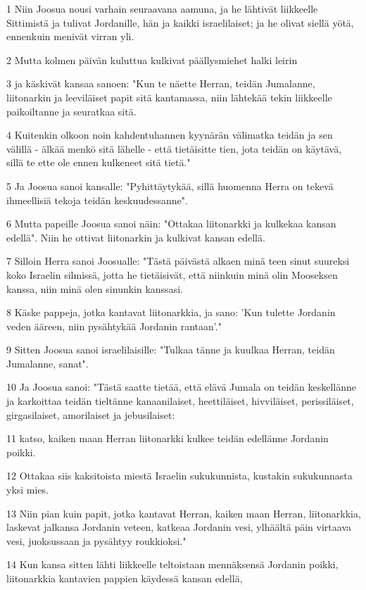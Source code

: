 \par 1 Niin Joosua nousi varhain seuraavana aamuna, ja he lähtivät liikkeelle Sittimistä ja tulivat Jordanille, hän ja kaikki israelilaiset; ja he olivat siellä yötä, ennenkuin menivät virran yli.
\par 2 Mutta kolmen päivän kuluttua kulkivat päällysmiehet halki leirin
\par 3 ja käskivät kansaa sanoen: "Kun te näette Herran, teidän Jumalanne, liitonarkin ja leeviläiset papit sitä kantamassa, niin lähtekää tekin liikkeelle paikoiltanne ja seuratkaa sitä.
\par 4 Kuitenkin olkoon noin kahdentuhannen kyynärän välimatka teidän ja sen välillä - älkää menkö sitä lähelle - että tietäisitte tien, jota teidän on käytävä, sillä te ette ole ennen kulkeneet sitä tietä."
\par 5 Ja Joosua sanoi kansalle: "Pyhittäytykää, sillä huomenna Herra on tekevä ihmeellisiä tekoja teidän keskuudessanne".
\par 6 Mutta papeille Joosua sanoi näin: "Ottakaa liitonarkki ja kulkekaa kansan edellä". Niin he ottivat liitonarkin ja kulkivat kansan edellä.
\par 7 Silloin Herra sanoi Joosualle: "Tästä päivästä alkaen minä teen sinut suureksi koko Israelin silmissä, jotta he tietäisivät, että niinkuin minä olin Mooseksen kanssa, niin minä olen sinunkin kanssasi.
\par 8 Käske pappeja, jotka kantavat liitonarkkia, ja sano: 'Kun tulette Jordanin veden ääreen, niin pysähtykää Jordanin rantaan'."
\par 9 Sitten Joosua sanoi israelilaisille: "Tulkaa tänne ja kuulkaa Herran, teidän Jumalanne, sanat".
\par 10 Ja Joosua sanoi: "Tästä saatte tietää, että elävä Jumala on teidän keskellänne ja karkoittaa teidän tieltänne kanaanilaiset, heettiläiset, hivviläiset, perissiläiset, girgasilaiset, amorilaiset ja jebusilaiset:
\par 11 katso, kaiken maan Herran liitonarkki kulkee teidän edellänne Jordanin poikki.
\par 12 Ottakaa siis kaksitoista miestä Israelin sukukunnista, kustakin sukukunnasta yksi mies.
\par 13 Niin pian kuin papit, jotka kantavat Herran, kaiken maan Herran, liitonarkkia, laskevat jalkansa Jordanin veteen, katkeaa Jordanin vesi, ylhäältä päin virtaava vesi, juoksussaan ja pysähtyy roukkioksi."
\par 14 Kun kansa sitten lähti liikkeelle teltoistaan mennäksensä Jordanin poikki, liitonarkkia kantavien pappien käydessä kansan edellä,
